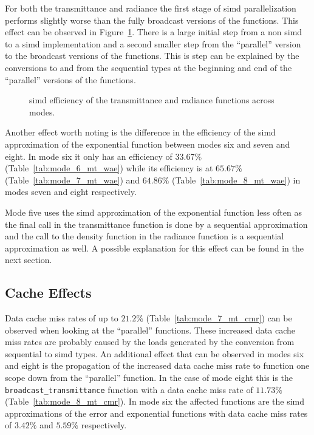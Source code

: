 \documentclass[a4paper, 11pt]{memoir}
\begin{document}
    For both the \gls{transmittance} and \gls{radiance} the first stage of \gls{simd} parallelization performs slightly
    worse than the fully broadcast versions of the functions. This effect can be observed in Figure~\ref{fig:efficiency}.
    There is a large initial step from a non \gls{simd} to a \gls{simd} implementation and a second smaller step from
    the \enquote{parallel} version to the broadcast versions of the functions. This is step can be explained by the
    conversions to and from the sequential types at the beginning and end of the \enquote{parallel} versions of the
    functions.

    \begin{figure}[t]
        \centering
        
        \caption{\gls{simd} efficiency of the \gls{transmittance} and \gls{radiance} functions across modes.}
        \label{fig:efficiency}
    \end{figure}

    Another effect worth noting is the difference in the efficiency of the \gls{simd} approximation of the exponential
    function between modes six and seven and eight. In mode six it only has an efficiency of $33.67\%$
    (Table~\ref{tab:mode_6_mt_wae}) while its efficiency is at $65.67\%$ (Table~\ref{tab:mode_7_mt_wae}) and $64.86\%$
    (Table~\ref{tab:mode_8_mt_wae}) in modes seven and eight respectively.

    Mode five uses the \gls{simd} approximation of the exponential function less often as the final call in the
    \gls{transmittance} function is done by a sequential approximation and the call to the density function in the
    \gls{radiance} function is a sequential approximation as well. A possible explanation for this effect can be found
    in the next section.

    \subsection{Cache Effects}
    \label{sec:res_cache}
    Data cache miss rates of up to $21.2\%$ (Table~\ref{tab:mode_7_mt_cmr}) can be observed when looking at the
    \enquote{parallel} functions. These increased data cache miss rates are probably caused by the loads generated by the
    conversion from sequential to \gls{simd} types. An additional effect that can be observed in modes six and eight is
    the propagation of the increased data cache miss rate to function one scope down from the \enquote{parallel} function.
    In the case of mode eight this is the \texttt{broadcast_transmittance} function with a data cache miss rate
    of $11.73\%$ (Table~\ref{tab:mode_8_mt_cmr}). In mode six the affected functions are the \gls{simd} approximations
    of the error and exponential functions with data cache miss rates of $3.42\%$ and $5.59\%$ respectively.
\end{document}
